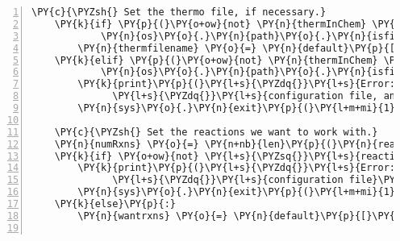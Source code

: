 \begin{Verbatim}[commandchars=\\\{\},fontsize=\small,numbers=left,firstnumber=1,stepnumber=2,firstline=2]
    \PY{c}{\PYZsh{} Set the thermo file, if necessary.}
    \PY{k}{if} \PY{p}{(}\PY{o+ow}{not} \PY{n}{thermInChem} \PY{o+ow}{and} \PY{l+s}{\PYZsq{}}\PY{l+s}{thermo input file}\PY{l+s}{\PYZsq{}} \PY{o+ow}{in} \PY{n}{default} \PY{o+ow}{and}
            \PY{n}{os}\PY{o}{.}\PY{n}{path}\PY{o}{.}\PY{n}{isfile}\PY{p}{(}\PY{n}{default}\PY{p}{[}\PY{l+s}{\PYZsq{}}\PY{l+s}{thermo input file}\PY{l+s}{\PYZsq{}}\PY{p}{]}\PY{p}{)}\PY{p}{)}\PY{p}{:}
        \PY{n}{thermfilename} \PY{o}{=} \PY{n}{default}\PY{p}{[}\PY{l+s}{\PYZsq{}}\PY{l+s}{thermo input file}\PY{l+s}{\PYZsq{}}\PY{p}{]}
    \PY{k}{elif} \PY{p}{(}\PY{o+ow}{not} \PY{n}{thermInChem} \PY{o+ow}{and} \PY{p}{(}\PY{o+ow}{not} \PY{l+s}{\PYZsq{}}\PY{l+s}{thermo input file}\PY{l+s}{\PYZsq{}} \PY{o+ow}{in} \PY{n}{default} \PY{o+ow}{or} \PY{o+ow}{not}
            \PY{n}{os}\PY{o}{.}\PY{n}{path}\PY{o}{.}\PY{n}{isfile}\PY{p}{(}\PY{n}{default}\PY{p}{[}\PY{l+s}{\PYZsq{}}\PY{l+s}{thermo input file}\PY{l+s}{\PYZsq{}}\PY{p}{]}\PY{p}{)}\PY{p}{)}\PY{p}{)}\PY{p}{:}
        \PY{k}{print}\PY{p}{(}\PY{l+s}{\PYZdq{}}\PY{l+s}{Error: the thermo file must be specified in the }\PY{l+s}{\PYZdq{}}
              \PY{l+s}{\PYZdq{}}\PY{l+s}{configuration file, and it must exist}\PY{l+s}{\PYZdq{}}\PY{p}{)}
        \PY{n}{sys}\PY{o}{.}\PY{n}{exit}\PY{p}{(}\PY{l+m+mi}{1}\PY{p}{)}

    \PY{c}{\PYZsh{} Set the reactions we want to work with.}
    \PY{n}{numRxns} \PY{o}{=} \PY{n+nb}{len}\PY{p}{(}\PY{n}{reacLines}\PY{p}{)}\PY{o}{\PYZhy{}}\PY{l+m+mi}{1}
    \PY{k}{if} \PY{o+ow}{not} \PY{l+s}{\PYZsq{}}\PY{l+s}{reactions}\PY{l+s}{\PYZsq{}} \PY{o+ow}{in} \PY{n}{default}\PY{p}{:}
        \PY{k}{print}\PY{p}{(}\PY{l+s}{\PYZdq{}}\PY{l+s}{Error: the reactions to study must be specified in the }\PY{l+s}{\PYZdq{}}
              \PY{l+s}{\PYZdq{}}\PY{l+s}{configuration file}\PY{l+s}{\PYZdq{}}\PY{p}{)}
        \PY{n}{sys}\PY{o}{.}\PY{n}{exit}\PY{p}{(}\PY{l+m+mi}{1}\PY{p}{)}
    \PY{k}{else}\PY{p}{:}
        \PY{n}{wantrxns} \PY{o}{=} \PY{n}{default}\PY{p}{[}\PY{l+s}{\PYZsq{}}\PY{l+s}{reactions}\PY{l+s}{\PYZsq{}}\PY{p}{]}


\end{Verbatim}
